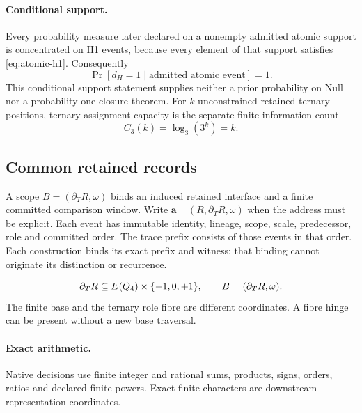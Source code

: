 \paragraph{Conditional support.}
\label{subsec:ternary-capacity}
Every probability measure later declared on a nonempty admitted atomic
support is concentrated on H1 events, because every element of that support
satisfies \eqref{eq:atomic-h1}. Consequently
\begin{equation}
\Pr[d_H=1\mid\text{admitted atomic event}]=1.
\label{eq:atomic-probability-one}
\end{equation}
This conditional support statement supplies neither a prior probability on
Null nor a probability-one closure theorem. For \(k\) unconstrained retained
ternary positions, ternary assignment capacity is the separate finite
information count
\begin{equation}
C_3(k)=\log_3(3^k)=k.
\label{eq:ternary-capacity}
\end{equation}

\subsection{Common retained records}
\label{subsec:afc-boundary-accounting}
A scope \(B=(\partial_T R,\omega)\) binds an induced retained interface and
a finite committed comparison window. Write \(\mathbf a\vdash(R,\partial_T
R,\omega)\) when the address must be explicit. Each event has immutable
identity, lineage, scope, scale, predecessor, role and committed order.
The trace prefix consists of those events in that order. Each construction
binds its exact prefix and witness; that binding cannot originate its
distinction or recurrence.


\begin{equation}
\partial_T R\subseteq E(Q_4)\times\{-1,0,+1\},
\qquad B=(\partial_T R,\omega).
\label{eq:tesseract-admissible-boundary}
\end{equation}
The finite base and the ternary role fibre are different coordinates. A fibre
hinge can be present without a new base traversal.

\paragraph{Exact arithmetic.}
\label{subsec:radical-free-arithmetic-policy}
Native decisions use finite integer and rational sums, products, signs,
orders, ratios and declared finite powers. Exact finite characters are
downstream representation coordinates.

